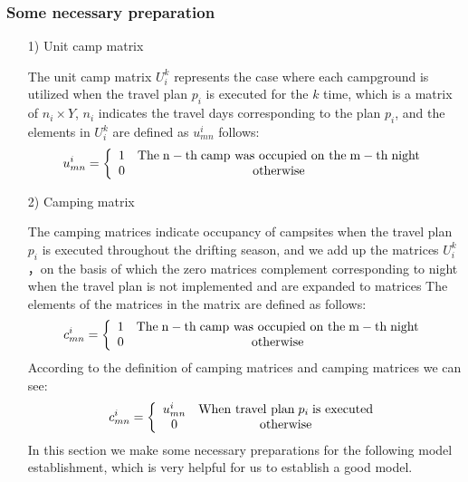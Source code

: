 \subsubsection{Some necessary preparation}
\begin{enumerate}
	\item[1)]Unit camp matrix 
	\par The unit camp matrix $U_i^k$ represents the case where each campground is utilized when the travel plan ${p_i}$ is executed for the $k$ time, which is a matrix of ${n_i} \times Y$, ${n_i}$ indicates the travel days corresponding to the plan ${p_i}$, and the elements in $U_i^k$ are defined as $u_{mn}^i$ follows:
	\begin{equation}
		u_{mn}^i = \left\{ {\begin{array}{*{20}{c}}
			{\rm{1}}&{{\rm{The\; n-th\; camp\ was\ occupied\ on\ the\; m-th\; night}}}\\
			{\rm{0}}&{{\rm{otherwise}}}
			\end{array}} \right.\label{aa1}
	\end{equation}
	
	\item[2)]Camping matrix
		\par The camping matrices indicate occupancy of campsites when the travel plan ${p_i}$ is executed throughout the drifting season, and we add up the matrices $U_i^k$ ，on the basis of which the zero matrices complement corresponding to night when the travel plan is not implemented and are expanded to matrices The elements of the matrices in the matrix are defined as follows:
		\begin{equation}
			c_{mn}^i = \left\{ {\begin{array}{*{20}{c}}
			{\rm{1}}&{{\rm{The\; n-th\; camp\ was\ occupied\ on\ the\; m-th\; night}}}\\
			{\rm{0}}&{{\rm{otherwise}}}
			\end{array}} \right.\label{aa1}
		\end{equation}
		According to the definition of camping matrices and camping matrices we can see:
		\begin{equation}
			c_{mn}^i = \left\{ {\begin{array}{*{20}{c}}
			{u_{mn}^i}&{{\rm{When\ travel\ plan\;  }}{p_i}\;{\rm{ is\ executed}}}\\
			{\rm{0}}&{{\rm{otherwise}}}
			\end{array}} \right.\label{aa1}
		\end{equation}
		In this section we make some necessary preparations for the following model establishment, which is very helpful for us to establish a good model.
	

\end{enumerate}
